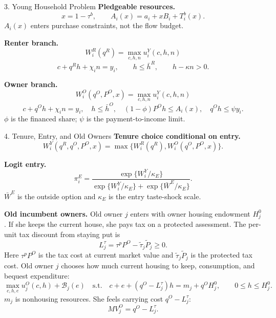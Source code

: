 \documentclass[11pt,aspectratio=169]{beamer}
\newcommand{\1}{\mathbf 1}
\begin{document}
\begin{frame}{3. Young Household Problem}
\small
\textbf{Pledgeable resources.}
\[
x=1-\tau^b,\qquad A_i(x)=a_i+xB_i+T_i^b(x).
\]
\(A_i(x)\) enters purchase constraints, not the flow budget.

\medskip
\textbf{Renter branch.}
\[
W_i^R(q^R)=\max_{c,h,n} u_i^Y(c,h,n)
\]
\[
c+q^R h+\chi_i n=y_i,\qquad h\le \bar h^R,\qquad h-\kappa n>0.
\]

\medskip
\textbf{Owner branch.}
\[
W_i^O(q^O,P^O,x)=\max_{c,h,n} u_i^Y(c,h,n)
\]
\[
c+q^O h+\chi_i n=y_i,\quad
h\le \bar h^O,\quad
(1-\phi)P^O h\le A_i(x),\quad
q^O h\le \psi y_i.
\]
\(\phi\) is the financed share; \(\psi\) is the payment-to-income limit.
\end{frame}

\begin{frame}{4. Tenure, Entry, and Old Owners}
\footnotesize
\textbf{Tenure choice conditional on entry.}
\[
W_i^Y(q^R,q^O,P^O,x)=\max\{W_i^R(q^R),W_i^O(q^O,P^O,x)\}.
\]

\smallskip
\textbf{Logit entry.}
\[
\pi_i^E
=
\frac{\exp\{W_i^Y/\kappa_E\}}
{\exp\{W_i^Y/\kappa_E\}+\exp\{\bar W^E/\kappa_E\}}.
\]
\(\bar W^E\) is the outside option and \(\kappa_E\) is the entry taste-shock scale.

\smallskip
\textbf{Old incumbent owners.}
Old owner \(j\) enters with owner housing endowment \(H_j^0\). If she keeps the current house, she pays tax on a protected assessment. The per-unit tax discount from staying put is
\[
L_j^\tau=\tau^pP^O-\tilde \tau_j\tilde P_j\ge0.
\]
Here \(\tau^pP^O\) is the tax cost at current market value and \(\tilde\tau_j\tilde P_j\) is the protected tax cost. Old owner \(j\) chooses how much current housing to keep, consumption, and bequest expenditure:
\[
\max_{c,h,e} u_j^O(c,h)+\mathcal B_j(e)
\quad\text{s.t.}\quad
c+e+(q^O-L_j^\tau)h=m_j+q^O H_j^0,\qquad 0\le h\le H_j^0.
\]
\(m_j\) is nonhousing resources. She feels carrying cost \(q^O-L_j^\tau\):
\[
MV_j^O=q^O-L_j^\tau.
\]
\end{frame}
\end{document}
